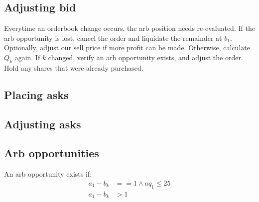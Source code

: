 \documentclass[12pt]{article}
\begin{document}
\subsection*{Adjusting bid}

Everytime an orderbook change occurs, the arb position needs re-evaluated. If the arb opportunity is lost,
cancel the order and liquidate the remainder at $b_1$. Optionally, adjust our sell price if more profit
can be made.
Otherwise, calculate $Q_k$ again. If $k$ changed,
verify an arb opportunity exists, and adjust the order. Hold any shares that were already purchased.

\subsection*{Placing asks}

\subsection*{Adjusting asks}

\subsection*{Arb opportunities}

An arb opportunity exists if:
\begin{align*}
a_1 - b_k &== 1 \wedge aq_1 \leq 25\\
a_1 - b_k &> 1\\
\end{align*}
\end{document}

